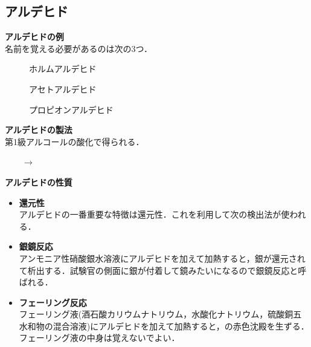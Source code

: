 \documentclass[a4paper,12pt]{ltjsreport}
\begin{document}
\subsection{アルデヒド}
\noindent \textbf{アルデヒドの例}\\
名前を覚える必要があるのは次の3つ．\\
\begin{minipage}{0.33\linewidth}
\begin{figure}[H]
    \centering
\caption{ホルムアルデヒド} 
\end{figure}
\end{minipage}
\begin{minipage}{0.33\linewidth}
\begin{figure}[H]
    \centering
\caption{アセトアルデヒド} 
\end{figure}
\end{minipage}
\begin{minipage}{0.33\linewidth}
\begin{figure}[H]
    \centering
\caption{プロピオンアルデヒド} 
\end{figure}
\end{minipage}
\noindent \textbf{アルデヒドの製法}\\
第1級アルコールの酸化で得られる．\\[4pt]
\centerline{~~~~$\longrightarrow$~~~~}
\noindent \textbf{アルデヒドの性質}
\begin{itemize}
    \item\textbf{還元性}\\
    アルデヒドの一番重要な特徴は還元性．これを利用して次の検出法が使われる．
    \item \textbf{銀鏡反応}\\
    アンモニア性硝酸銀水溶液にアルデヒドを加えて加熱すると，銀が還元されて析出する．試験官の側面に銀が付着して鏡みたいになるので銀鏡反応と呼ばれる．
    \item \textbf{フェーリング反応}\\
    フェーリング液(酒石酸カリウムナトリウム，水酸化ナトリウム，硫酸銅五水和物の混合溶液)にアルデヒドを加えて加熱すると，{\color{red}\textbf{}}の赤色沈殿を生ずる．フェーリング液の中身は覚えないでよい．
\end{itemize}
\end{document}
